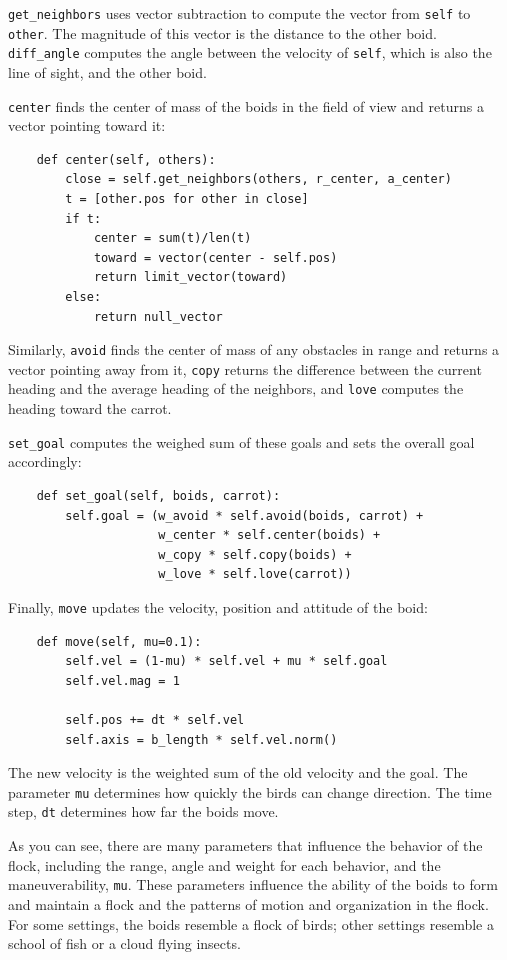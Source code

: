 \documentclass[10pt]{book}
\begin{document}
\verb"get_neighbors" uses vector subtraction to compute the
vector from {\tt self} to {\tt other}.  The magnitude of
this vector is the distance to the other boid.  \verb"diff_angle"
computes the angle between the velocity of {\tt self}, which
is also the line of sight, and the other boid.

{\tt center} finds the center of mass of the boids in the
field of view and returns a vector pointing toward it:

\begin{verbatim}
    def center(self, others):
        close = self.get_neighbors(others, r_center, a_center)
        t = [other.pos for other in close]
        if t:
            center = sum(t)/len(t)
            toward = vector(center - self.pos)
            return limit_vector(toward)
        else:
            return null_vector
\end{verbatim}

Similarly, {\tt avoid} finds the center of mass of any obstacles
in range and returns a vector pointing away from it,
{\tt copy} returns the difference between the current heading
and the average heading of the neighbors, and {\tt love}
computes the heading toward the carrot.

\verb"set_goal" computes the weighed sum of these goals and
sets the overall goal accordingly:

\begin{verbatim}
    def set_goal(self, boids, carrot):
        self.goal = (w_avoid * self.avoid(boids, carrot) + 
                     w_center * self.center(boids) +
                     w_copy * self.copy(boids) + 
                     w_love * self.love(carrot))
\end{verbatim}

Finally, {\tt move} updates the velocity, position and
attitude of the boid:

\begin{verbatim}
    def move(self, mu=0.1):
        self.vel = (1-mu) * self.vel + mu * self.goal
        self.vel.mag = 1

        self.pos += dt * self.vel
        self.axis = b_length * self.vel.norm()
\end{verbatim}

The new velocity is the weighted sum of the old velocity
and the goal.  The parameter {\tt mu} determines how quickly
the birds can change direction.  The time step, {\tt dt}
determines how far the boids move.

As you can see, there are many parameters that influence the behavior
of the flock, including the range, angle and weight for each behavior,
and the maneuverability, {\tt mu}.  These parameters influence the
ability of the boids to form and maintain a flock and the patterns
of motion and organization in the flock.  For some settings,
the boids resemble a flock of birds; other settings resemble
a school of fish or a cloud flying insects.
\end{document}

